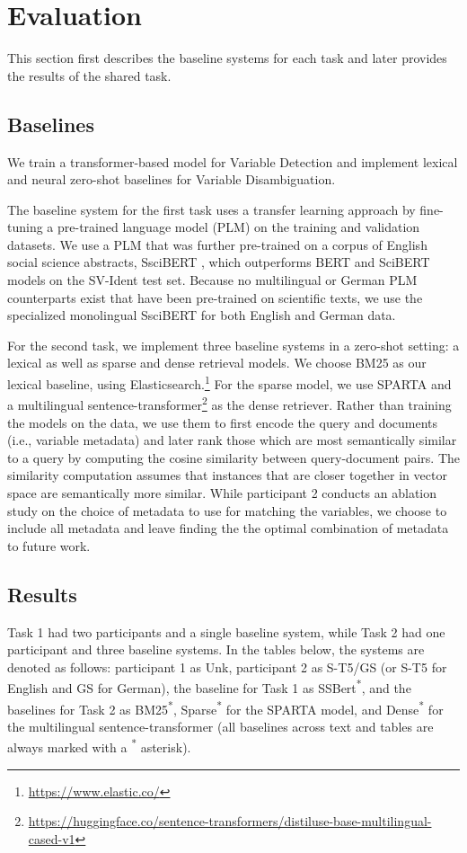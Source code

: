 \documentclass[11pt]{article}
\begin{document}
\section{Evaluation}
\label{sec:evaluation}
This section first describes the baseline systems for each task and later provides the results of the shared task.

\subsection{Baselines}
\label{sec:baselines}
We train a transformer-based model for Variable Detection and implement lexical and neural zero-shot baselines for Variable Disambiguation.

The baseline system for the first task uses a transfer learning approach by fine-tuning a pre-trained language model (PLM) on the training and validation datasets.
We use a PLM that was further pre-trained on a corpus of English social science abstracts, SsciBERT \citep{shen2022sscibert}, which outperforms BERT \citep{devlin-etal-2019-bert} and SciBERT \citep{beltagy-etal-2019-scibert} models on the SV-Ident test set.
Because no multilingual or German PLM counterparts exist that have been pre-trained on scientific texts, we use the specialized monolingual SsciBERT for both English and German data.

For the second task, we implement three baseline systems in a zero-shot setting: a lexical as well as sparse and dense retrieval models.
We choose BM25 as our lexical baseline, using Elasticsearch.\footnote{\url{https://www.elastic.co/}}
For the sparse model, we use SPARTA \citep{zhao-etal-2021-sparta} and a multilingual sentence-transformer\footnote{\url{https://huggingface.co/sentence-transformers/distiluse-base-multilingual-cased-v1}} \citep{reimers-gurevych-2019-sentence,reimers-gurevych-2020-making} as the dense retriever.
Rather than training the models on the data, we use them to first encode the query and documents (i.e., variable metadata) and later rank those which are most semantically similar to a query by computing the cosine similarity between query-document pairs.
The similarity computation assumes that instances that are closer together in vector space are semantically more similar.
While participant 2 conducts an ablation study on the choice of metadata to use for matching the variables, we choose to include all metadata and leave finding the the optimal combination of metadata to future work.

\subsection{Results}
Task 1 had two participants and a single baseline system, while Task 2 had one participant and three baseline systems.
In the tables below, the systems are denoted as follows: participant 1 as Unk, participant 2 as S-T5/GS (or S-T5 for English and GS for German), the baseline for Task 1 as SSBert\textsuperscript{*}, and the baselines for Task 2 as BM25\textsuperscript{*}, Sparse\textsuperscript{*} for the SPARTA model, and Dense\textsuperscript{*} for the multilingual sentence-transformer (all baselines across text and tables are always marked with a \textsuperscript{*} asterisk).
\end{document}

